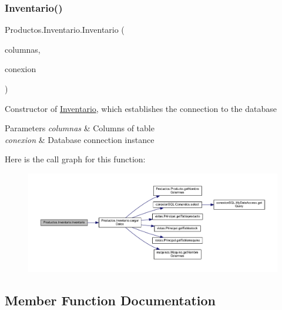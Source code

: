 \subsubsection{\texorpdfstring{Inventario()}{Inventario()}}
{\footnotesize\ttfamily Productos.\+Inventario.\+Inventario (\begin{DoxyParamCaption}\item[{\mbox{\hyperlink{class_productos_1_1_modelo_columnas_tabla_producto}{Modelo\+Columnas\+Tabla\+Producto}}}]{columnas,  }\item[{\mbox{\hyperlink{classconexion_s_q_l_1_1_my_data_access}{My\+Data\+Access}}}]{conexion }\end{DoxyParamCaption})}

Constructor of \mbox{\hyperlink{class_productos_1_1_inventario}{Inventario}}, which establishes the connection to the database 
\begin{DoxyParams}{Parameters}
{\em columnas} & Columns of table \\
\hline
{\em conexion} & Database connection instance \\
\hline
\end{DoxyParams}
Here is the call graph for this function\+:
\nopagebreak
\begin{figure}[H]
\begin{center}
\leavevmode
\includegraphics[width=350pt]{class_productos_1_1_inventario_a679f0131ec8bfb9a78d5071ee72f6811_cgraph}
\end{center}
\end{figure}


\subsection{Member Function Documentation}
\mbox{\label{class_productos_1_1_inventario_a89ddb54b03480d0e837f56be549b755c}} 
